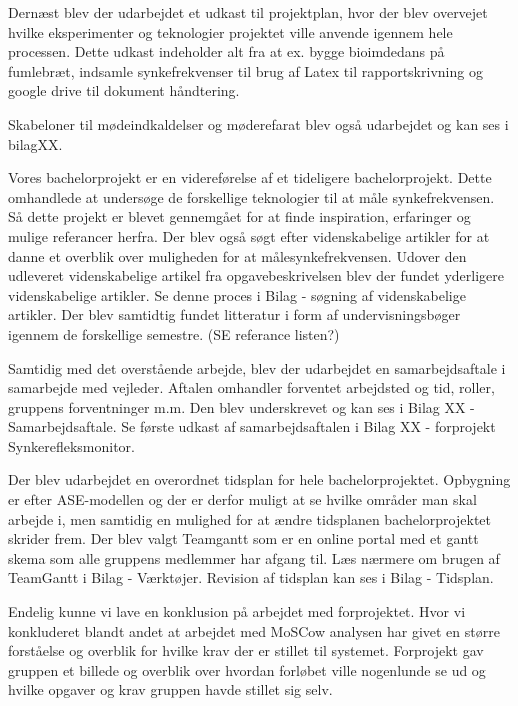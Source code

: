 Dernæst blev der udarbejdet et udkast til projektplan, hvor der blev overvejet hvilke eksperimenter og teknologier projektet ville anvende igennem hele processen. Dette udkast indeholder alt fra at ex. bygge bioimdedans på fumlebræt, indsamle synkefrekvenser til brug af Latex til rapportskrivning og google drive til dokument håndtering.

Skabeloner til mødeindkaldelser og møderefarat blev også udarbejdet og kan ses i bilagXX.
 
Vores bachelorprojekt er en videreførelse af et tideligere bachelorprojekt. Dette omhandlede at undersøge de forskellige teknologier til at måle synkefrekvensen. Så dette projekt er blevet gennemgået for at finde inspiration, erfaringer og mulige referancer herfra. Der blev også søgt efter videnskabelige artikler for at danne et overblik over muligheden for at målesynkefrekvensen. Udover den udleveret videnskabelige artikel fra opgavebeskrivelsen blev der fundet yderligere videnskabelige artikler. Se denne proces i Bilag - søgning af videnskabelige artikler. Der blev samtidtig fundet litteratur i form af undervisningsbøger igennem de forskellige semestre. (SE referance listen?)
 
Samtidig med det overstående arbejde, blev der udarbejdet en samarbejdsaftale i samarbejde med vejleder. Aftalen omhandler forventet arbejdsted og tid, roller, gruppens forventninger m.m. Den blev underskrevet og kan ses i Bilag XX - Samarbejdsaftale. Se første udkast af samarbejdsaftalen i Bilag XX - forprojekt Synkerefleksmonitor.

Der blev udarbejdet en overordnet tidsplan for hele bachelorprojektet. Opbygning er efter ASE-modellen og der er derfor muligt at se hvilke områder man skal arbejde i, men samtidig en mulighed for at ændre tidsplanen bachelorprojektet skrider frem. Der blev valgt Teamgantt som er en online portal med et gantt skema som alle gruppens medlemmer har afgang til. Læs nærmere om brugen af TeamGantt i Bilag - Værktøjer. Revision af tidsplan kan ses i Bilag - Tidsplan. 
 
Endelig kunne vi lave en konklusion på arbejdet med forprojektet. Hvor vi konkluderet blandt andet at arbejdet med MoSCow analysen har givet en større forståelse og overblik for hvilke krav der er stillet til systemet. Forprojekt gav gruppen et billede og overblik over hvordan forløbet ville nogenlunde se ud og hvilke opgaver og krav gruppen havde stillet sig selv. 



 


